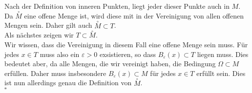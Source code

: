 \documentclass[11pt,a4paper,ngerman]{article}
\begin{document}
\begin{enumerate}[(i)]
            Nach der Definition von inneren Punkten, liegt jeder dieser Punkte auch in $M$.
            Da $\overset{\circ}{M}$ eine offene Menge ist, wird diese mit in der Vereinigung von
            allen offenen Mengen sein. Daher gilt auch $\overset{\circ}{M} \subset T$.\\

            Als nächstes zeigen wir $T \subset \overset{\circ}{M}$.\\
            Wir wissen, dass die Vereinigung in diesem Fall eine offene Menge sein muss. Für jedes
            $x \in T$ muss also ein $\varepsilon > 0$ exsistieren, so dass $B_\varepsilon(x) \subset T$
            liegen muss. Dies bedeutet aber, da alle Mengen, die wir vereinigt haben, die Bedingung
            $\Omega \subset M$ erfüllen. Daher muss insbesondere $B_\varepsilon(x) \subset M$ für jedes
            $x \in T$ erfüllt sein. Dies ist nun allerdings genau die Definition von $\overset{\circ}{M}$.\\
            \mbox{}\hfill $\square$
            
	\end{enumerate}
\end{document}
